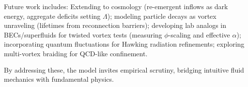 Future work includes: Extending to cosmology (re-emergent inflows as dark energy, aggregate deficits setting $\Lambda$); modeling particle decays as vortex unraveling (lifetimes from reconnection barriers); developing lab analogs in BECs/superfluids for twisted vortex tests (measuring $\phi$-scaling and effective $\alpha$); incorporating quantum fluctuations for Hawking radiation refinements; exploring multi-vortex braiding for QCD-like confinement.

By addressing these, the model invites empirical scrutiny, bridging intuitive fluid mechanics with fundamental physics.

\medskip
\noindent
{}
\medskip

